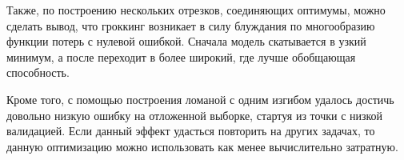 \documentclass{article} %
\begin{document}
Также, по построению нескольких отрезков, соединяющих оптимумы, можно сделать вывод, что гроккинг возникает в силу блуждания по многообразию функции потерь с нулевой ошибкой. Сначала модель скатывается в узкий минимум, а после переходит в более широкий, где лучше обобщающая способность.

Кроме того, с помощью построения ломаной с одним изгибом удалось достичь довольно низкую ошибку на отложенной выборке, стартуя из точки с низкой валидацией. Если данный эффект удасться повторить на других задачах, то данную оптимизацию можно использовать как менее вычислительно затратную. 
\newpage



\end{document}

